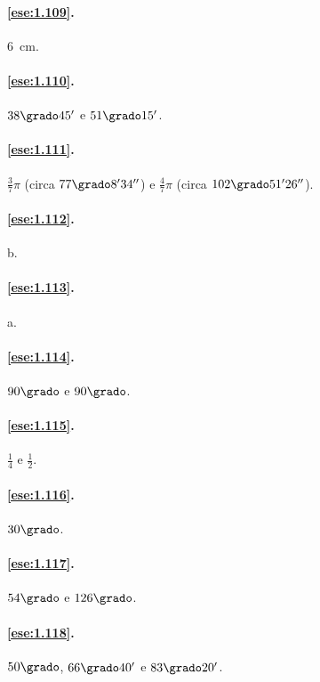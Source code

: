 \paragraph{\ref{ese:1.109}.}
6~cm.

\paragraph{\ref{ese:1.110}.}
$38\grado 45'$ e $51\grado 15'$.

\paragraph{\ref{ese:1.111}.}
$\frac{3}{7}\pi$ (circa $77\grado 8' 34''$) e $\frac{4}{7}\pi$ (circa 
$102\grado 51' 26''$).

\paragraph{\ref{ese:1.112}.}
b.

\paragraph{\ref{ese:1.113}.}
a.

\paragraph{\ref{ese:1.114}.}
$90\grado$ e $90\grado$.

\paragraph{\ref{ese:1.115}.}
$\frac{1}{4}$ e $\frac{1}{2}$.

\paragraph{\ref{ese:1.116}.}
$30\grado$.

\paragraph{\ref{ese:1.117}.}
$54\grado$ e $126\grado$.

\paragraph{\ref{ese:1.118}.}
$50\grado$, $66\grado 40'$ e $83\grado 20'$.

